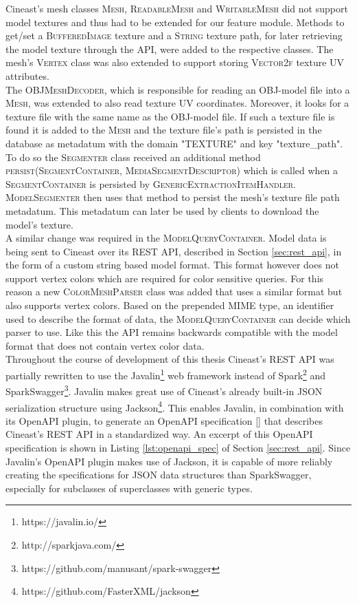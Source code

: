 Cineast's mesh classes \textsc{Mesh}, \textsc{ReadableMesh} and \textsc{WritableMesh} did not support model textures and thus had to be extended
for our feature module. Methods to get/set a \textsc{BufferedImage} texture and a \textsc{String} texture path, for later retrieving the model texture
through the API, were added to the respective classes. The mesh's \textsc{Vertex} class was also extended to support storing \textsc{Vector2f} texture UV attributes.\\
The \textsc{OBJMeshDecoder}, which is responsible for reading an OBJ-model file into a \textsc{Mesh}, was extended to also read texture UV coordinates.
Moreover, it looks for a texture file with the same name as the OBJ-model file. If such a texture file is found it is added to the \textsc{Mesh} and the texture file's
path is persisted in the database as metadatum with the domain "TEXTURE" and key "texture\_path". To do so the \textsc{Segmenter} class received an additional method
\textsc{persist(SegmentContainer, MediaSegmentDescriptor)} which is called when a \textsc{SegmentContainer} is persisted by \textsc{GenericExtractionItemHandler}.
\textsc{ModelSegmenter} then uses that method to persist the mesh's texture file path metadatum. This metadatum can later be used by clients to download the model's texture.\\
A similar change was required in the \textsc{ModelQueryContainer}. Model data is being sent to Cineast over its REST API, described in Section \ref{sec:rest_api}, in the form of a custom string based model format. This format however does not support vertex colors which are required for color sensitive queries. For this reason a new \textsc{ColorMeshParser} class was added that uses a similar format but also supports vertex colors. Based on the prepended MIME type, an identifier used to describe the format of data, the \textsc{ModelQueryContainer} can decide which parser to use. Like this the API remains backwards compatible with the model format that does not contain vertex color data.\\
Throughout the course of development of this thesis Cineast's REST API was partially rewritten to use the Javalin\footnote{https://javalin.io/} web framework instead of Spark\footnote{http://sparkjava.com/} and SparkSwagger\footnote{https://github.com/manusant/spark-swagger}. Javalin makes great use of Cineast's already built-in JSON serialization structure using Jackson\footnote{https://github.com/FasterXML/jackson}. This enables Javalin, in combination with its OpenAPI plugin,
to generate an OpenAPI specification [] that describes Cineast's REST API in a standardized way. An excerpt of this OpenAPI specification is shown in Listing \ref{lst:openapi_spec} of Section \ref{sec:rest_api}. Since Javalin's OpenAPI plugin makes use of Jackson, it is capable of more reliably creating the specifications for JSON data structures than SparkSwagger, especially for subclasses of superclasses with generic types.

